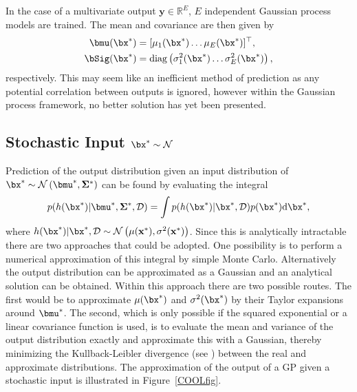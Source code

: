 In the case of a multivariate output $\mathbf{y} \in \mathbb{R}^E$, $E$ independent Gaussian process models are trained. The mean and covariance are then given by
\begin{align}
\bmu(\bx^*)&= [ \mu_1(\bx^*)\dots\mu_E(\bx^*) ]^\top , \label{Mu}\\
\bSig(\bx^*)&=\mathrm{diag} \left( \sigma_1^2(\bx^*)\dots\sigma_E^2(\bx^*) \right), \label{Sigma}
\end{align}
respectively. This may seem like an inefficient method of prediction as any potential correlation between outputs is ignored, however within the Gaussian process framework, no better solution has yet been presented.





\subsection{Stochastic Input $\bx^* \sim \mathcal{N}$}

Prediction of the output distribution given an input distribution of $\bx^* \sim \mathcal{N}\left(\bmu^*,\mathbf{\Sigma}^*\right)$ can be found by evaluating the integral
\begin{equation} \label{stocint}
p(h(\bx^*)|\bmu^*,\mathbf{\Sigma}^*,\mathcal{D}) = \int p(h(\bx^*)|\bx^*,\mathcal{D})p(\bx^*)\mathrm{d} \bx^*,
\end{equation}
where $h(\bx^*)|\bx^*,\mathcal{D} \sim \mathcal{N}\left(\mu(\mathbf{x^*}),\sigma^2(\mathbf{x^*})\right)$. Since this is analytically intractable there are two approaches that could be adopted. One possibility is to perform a numerical approximation of this integral by simple Monte Carlo. Alternatively the output distribution can be approximated as a Gaussian and an analytical solution can be obtained. Within this approach there are two possible routes. The first would be to approximate $\mu(\bx^*)$ and $\sigma^2(\bx^*)$ by their Taylor expansions around $\bmu^*$. The second, which is only possible if the squared exponential or a linear covariance function is used, is to evaluate the mean and variance of the output distribution exactly and approximate this with a Gaussian, thereby minimizing the Kullback-Leibler divergence (see \cite{KL51}) between the real and approximate distributions. The approximation of the output of a GP given a stochastic input is illustrated in Figure~\ref{COOLfig}.

